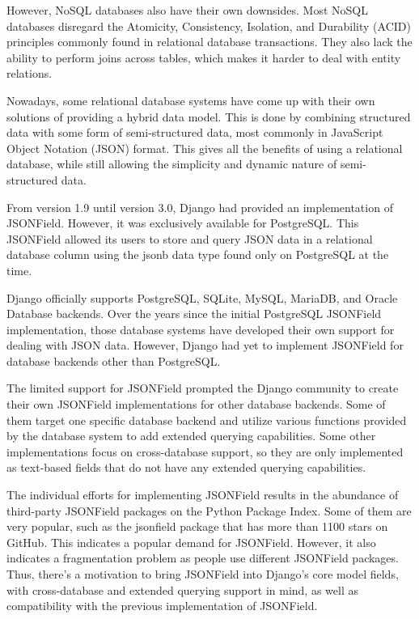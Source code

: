 However, NoSQL databases also have their own downsides. Most NoSQL databases
disregard the Atomicity, Consistency, Isolation, and Durability (ACID)
principles commonly found in relational database transactions. They also lack
the ability to perform joins across tables, which makes it harder to deal with
entity relations.

Nowadays, some relational database systems have come up with their own
solutions of providing a hybrid data model. This is done by combining
structured data with some form of semi-structured data, most commonly in
JavaScript Object Notation (JSON) format. This gives all the benefits of using
a relational database, while still allowing the simplicity and dynamic nature
of semi-structured data.

From version 1.9 until version 3.0, Django had provided an implementation of
JSONField. However, it was exclusively available for PostgreSQL. This JSONField
allowed its users to store and query JSON data in a relational database column
using the jsonb data type found only on PostgreSQL at the time.

Django officially supports PostgreSQL, SQLite, MySQL, MariaDB, and Oracle
Database backends. Over the years since the initial PostgreSQL JSONField
implementation, those database systems have developed their own support for
dealing with JSON data. However, Django had yet to implement JSONField for
database backends other than PostgreSQL.

The limited support for JSONField prompted the Django community to create their
own JSONField implementations for other database backends. Some of them target
one specific database backend and utilize various functions provided by the
database system to add extended querying capabilities. Some other
implementations focus on cross-database support, so they are only implemented
as text-based fields that do not have any extended querying capabilities.

The individual efforts for implementing JSONField results in the abundance of
third-party JSONField packages on the Python Package Index. Some of them are
very popular, such as the jsonfield package that has more than 1100 stars on
GitHub. This indicates a popular demand for JSONField. However, it also
indicates a fragmentation problem as people use different JSONField packages.
Thus, there's a motivation to bring JSONField into Django's core model fields,
with cross-database and extended querying support in mind, as well as
compatibility with the previous implementation of JSONField.

